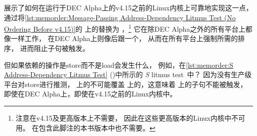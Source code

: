 \begin{fcvref}
展示了如何在运行于DEC Alpha上的v4.15之前的Linux内核上可靠地实现这一点，
通过将\cref{lst:memorder:Message-Passing Address-Dependency Litmus Test (No Ordering Before v4.15)}的
上的替换为
，\footnote{
	注意在v4.15及更高版本上不需要，
	因此在这些更高版本的Linux内核中不可用。
	在包含此脚注的本书版本中也不需要。}
它在除DEC Alpha之外的所有平台上都像一样工作，
在DEC Alpha上则像后跟一个，
从而在所有平台上强制所需的排序，
进而阻止子句被触发。
\end{fcvref}

\begin{listing}

\caption{S 地址依赖石蕊测试}
\label{lst:memorder:S Address-Dependency Litmus Test}
\end{listing}

\begin{fcvref}
但如果依赖的操作是store而不是load会发生什么，
例如，在\cref{lst:memorder:S Address-Dependency Litmus Test}
()中所示的
\emph{S} litmus test~\cite{JadeAlglave2011ppcmem}中？
因为没有生产级平台对store进行推测，
上的不可能覆盖
上的，这意味着
上的子句不能被触发，
即使在DEC Alpha上，即使在v4.15之前的Linux内核中。
\end{fcvref}

